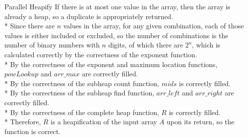 \documentclass[letterpaper, reqno, 11pt]{article}
\begin{document}
\begin{description}
	\item{Parallel Heapify}
	If there is at most one value in the array, then the array is already a heap,
	so a duplicate is appropriately returned.\\*
	Since there are $n$ values in the array, for any given combination, each of those values
	is either included or excluded, so the number of combinations is the number of binary
	numbers with $n$ digits, of which there are $2^n$, which is calculated correctly by the
	correctness of the exponent function.\\*
	By the correctness of the exponent and maximum location functions, $powLookup$ and $arr\_max$
	are correctly filled.\\*
	By the correctness of the subheap count function, $mids$ is correctly filled.\\*
	By the correctness of the subheap find function, $arr\_left$ and $arr\_right$ are correctly filled.\\*
	By the correctness of the complete heap function, $R$ is correctly filled.\\*
	Therefore, $R$ is a heapification of the input array $A$ upon its return, so the function is correct.

\end{description}
\end{document}

